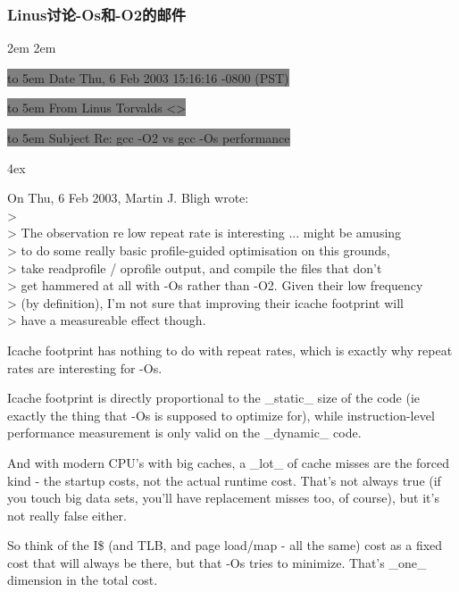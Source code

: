 \documentclass[amstex,twoside]{ctexbook}
\newenvironment{insertnote}{ \ttfamily\CJKfamily{KaiTi} }{\vskip 0.5cm }
\begin{document}
\begin{insertnote}

\subsubsection*{Linus讨论-Os和-O2的邮件}

\leftskip 2em
\rightskip 2em
\parindent 0pt

\colorbox{gray}{\hbox to 5em {Date} Thu, 6 Feb 2003 15:16:16 -0800 (PST)}

\colorbox{gray}{\hbox to 5em {From}	 Linus Torvalds <>   }

\colorbox{gray}{\hbox to 5em {Subject}	Re: gcc -O2 vs gcc -Os performance }

\footnotesize 

\parskip 4ex

\noindent{}On Thu, 6 Feb 2003, Martin J. Bligh wrote:\\
> \\
> The observation re low repeat rate is interesting ... might be amusing \\
> to do some really basic profile-guided optimisation on this grounds,\\
> take readprofile / oprofile output, and compile the files that don't\\
> get hammered at all with -Os rather than -O2. Given their low frequency\\
> (by definition), I'm not sure that improving their icache footprint will\\
> have a measureable effect though.

Icache footprint has nothing to do with repeat rates, which is exactly why 
repeat rates are interesting for -Os.

Icache footprint is directly proportional to the \_static\_ size of the code 
(ie exactly the thing that -Os is supposed to optimize for), while 
instruction-level performance measurement is only valid on the \_dynamic\_ 
code.

And with modern CPU's with big caches, a \_lot\_ of cache misses are the 
forced kind - the startup costs, not the actual runtime cost. That's not 
always true (if you touch big data sets, you'll have replacement misses 
too, of course), but it's not really false either.

So think of the I\$ (and TLB, and page load/map - all the same) cost as a 
fixed cost that will always be there, but that -Os tries to minimize. 
That's \_one\_ dimension in the total cost.


\end{insertnote}
\end{document}
